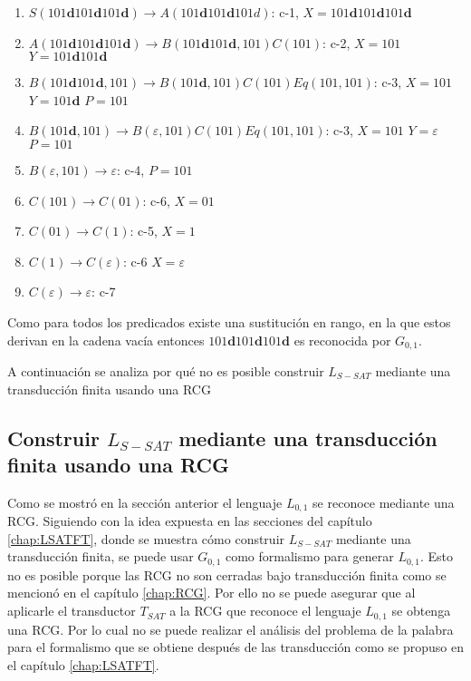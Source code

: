 \begin{enumerate}
    \item $S(101\mathbf{d}101\mathbf{d}101\mathbf{d}) \to A(101\mathbf{d}101\mathbf{d}101d)$: c-1, $X=101\mathbf{d}101\mathbf{d}101\mathbf{d}$
    \item $A(101\mathbf{d}101\mathbf{d}101\mathbf{d}) \to B(101\mathbf{d}101\mathbf{d},101)C(101)$: c-2, $X=101$ $Y=101\mathbf{d}101\mathbf{d}$
    \item $B(101\mathbf{d}101\mathbf{d},101) \to B(101\mathbf{d},101)C(101)Eq(101,101)$: c-3, $X=101$ $Y=101\mathbf{d}$ $P=101$
    \item $B(101\mathbf{d},101) \to B(\varepsilon,101)C(101)Eq(101,101)$: c-3, $X=101$ $Y=\varepsilon$ $P=101$
    \item $B(\varepsilon,101) \to \varepsilon$: c-4, $P=101$
    \item $C(101)\to C(01)$: c-6, $X=01$
    \item $C(01)\to C(1)$: c-5, $X=1$
    \item $C(1)\to C(\varepsilon)$: c-6 $X=\varepsilon$
    \item $C(\varepsilon)\to \varepsilon$: c-7
\end{enumerate}

Como para todos los predicados existe una sustitución en rango, en la que estos derivan en la cadena vacía
entonces $101\mathbf{d}101\mathbf{d}101\mathbf{d}$ es reconocida por $G_{0,1}$.

A continuación se analiza por qué no es posible construir $L_{S-SAT}$ mediante una transducción finita usando
una RCG

\subsection{Construir $L_{S-SAT}$ mediante una transducción finita usando una RCG}

Como se mostró en la sección anterior el lenguaje $L_{0,1}$ se reconoce mediante una RCG.  Siguiendo con la
idea expuesta en las secciones del capítulo \ref{chap:LSATFT}, donde se muestra cómo construir $L_{S-SAT}$
mediante una transducción finita, se puede usar $G_{0,1}$ como formalismo para generar $L_{0,1}$.
Esto no es posible porque las RCG no son cerradas bajo transducción finita como se mencionó en el
capítulo \ref{chap:RCG}.  Por ello no se puede asegurar que al aplicarle el transductor $T_{SAT}$ a
la RCG que reconoce el lenguaje $L_{0,1}$ se obtenga una RCG. Por lo cual no se puede realizar el
análisis del problema de la palabra para el formalismo que se obtiene después de las transducción
como se propuso en el capítulo \ref{chap:LSATFT}.

